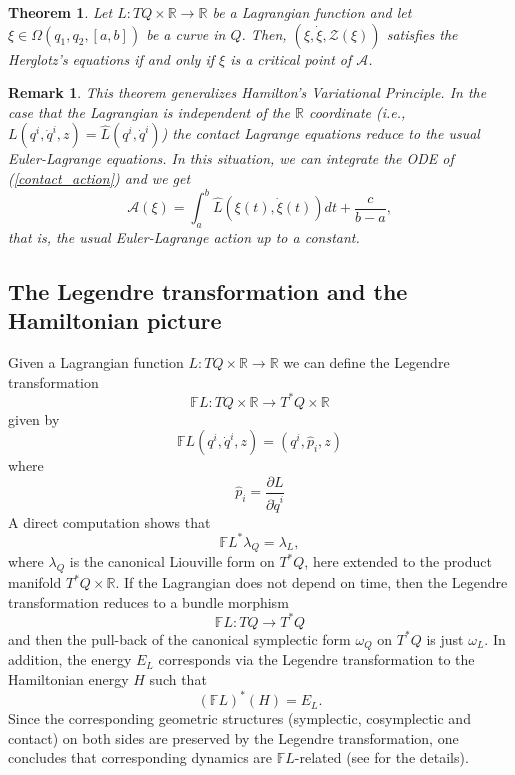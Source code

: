\documentclass[12pt]{article}
\newtheorem{theorem}{Theorem}[section]
\newtheorem{remark}{Remark}[section]
\begin{document}
\begin{theorem}
    Let $L: TQ \times \mathbb{R} \to \mathbb{R}$ be a Lagrangian function and let $\xi\in  \Omega(q_1,q_2, [a,b])$ be a curve in $Q$. Then, $(\xi,\dot\xi, \mathcal{Z}(\xi))$ satisfies the Herglotz's equations  if and only if $\xi$ is a critical point of $\mathcal{A}$.
\end{theorem}
\bigskip
\begin{remark}{\rm
    This theorem generalizes Hamilton's Variational Principle. In the case that the Lagrangian is independent of the $\mathbb{R}$ coordinate (i.e., $L(q^i,\dot{q}^i,z)=\hat{L}(q^i, \dot{q}^i)$)  
the contact Lagrange equations reduce to the usual Euler-Lagrange equations. In this situation, we can integrate the ODE of (\ref{contact_action}) and we get
    \begin{equation}
    \mathcal{A}(\xi) = \int_a^b \hat L(\xi(t),\dot\xi(t))d t + \frac{c}{b-a},
    \end{equation}
    that is, the usual Euler-Lagrange action up to a constant.}
\end{remark}


\subsection{The Legendre transformation and the Hamiltonian picture}

Given a Lagrangian function $L : TQ \times \mathbb R \longrightarrow \mathbb R$ we can define the Legendre transformation 
$$
\mathbb{F}L : TQ \times \mathbb R \longrightarrow T^*Q \times \mathbb R
$$
given by
$$
\mathbb{F}L (q^i, \dot{q}^i, z) = (q^i, \hat{p}_i, z)
$$
where
$$
\hat{p}_ i = \frac{\partial L}{\partial \dot{q}^i}
$$
A direct computation shows that
$$
\mathbb{F}L ^* \lambda_Q = \lambda_L,
$$
where $\lambda_Q$ is the canonical Liouville form on $T^*Q$, here extended to the product manifold $ T^*Q \times \mathbb R$. If the Lagrangian does not depend on time, then the Legendre transformation reduces to a bundle morphism
$$
\mathbb{F}L : TQ \longrightarrow T^*Q 
$$
and then the pull-back of the canonical symplectic form $\omega_Q$ on $T^*Q$ is just $\omega_L$. In addition, the energy $E_L$ corresponds via the Legendre transformation to the Hamiltonian energy $H$ such that
$$
(\mathbb{F}L)^*(H) = E_L.
$$
Since the corresponding geometric structures (symplectic, cosymplectic and contact) on both sides are preserved by the Legendre transformation, one concludes that corresponding dynamics are $\mathbb{F}L$-related (see \cites{canaria} for the details).
\end{document}
